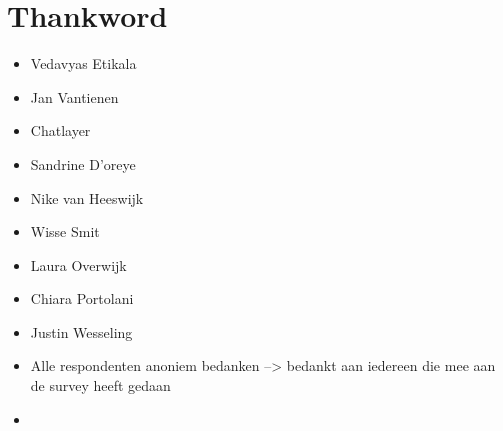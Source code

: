 \chapter*{Thankword\hfill} 
\label{ch:thankword}

\begin{itemize}
	\item Vedavyas Etikala
	\item Jan Vantienen
	\item Chatlayer
	\item Sandrine D'oreye
	\item Nike van Heeswijk
	\item Wisse Smit
	\item Laura Overwijk
	\item Chiara Portolani
	\item Justin Wesseling
	\item Alle respondenten anoniem bedanken --> bedankt aan iedereen die mee aan de survey heeft gedaan
	\item
\end{itemize}









